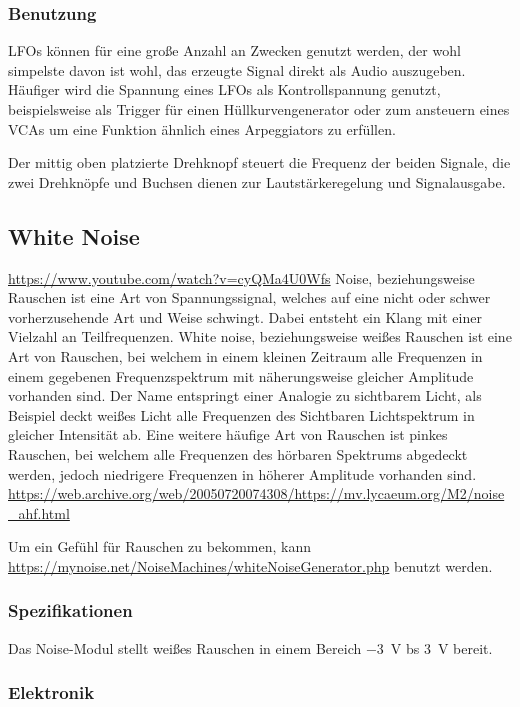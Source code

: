 \subsubsection{Benutzung}
\label{sec:org00ae4b0}
LFOs können für eine große Anzahl an Zwecken genutzt werden, der wohl simpelste davon ist wohl, das erzeugte Signal direkt als Audio auszugeben. Häufiger wird die Spannung eines LFOs als Kontrollspannung genutzt, beispielsweise als Trigger für einen Hüllkurvengenerator oder zum ansteuern eines VCAs um eine Funktion ähnlich eines Arpeggiators zu erfüllen.

Der mittig oben platzierte Drehknopf steuert die Frequenz der beiden Signale, die zwei Drehknöpfe und Buchsen dienen zur Lautstärkeregelung und Signalausgabe.

\subsection{White Noise}
\label{sec:orgd663e80}
\url{https://www.youtube.com/watch?v=cyQMa4U0Wfs}
Noise, beziehungsweise Rauschen ist eine Art von Spannungssignal, welches auf eine nicht oder schwer vorherzusehende Art und Weise schwingt. Dabei entsteht ein Klang mit einer Vielzahl an Teilfrequenzen. White noise, beziehungsweise weißes Rauschen ist eine Art von Rauschen, bei welchem in einem kleinen Zeitraum alle Frequenzen in einem gegebenen Frequenzspektrum mit näherungsweise gleicher Amplitude vorhanden sind. Der Name entspringt einer Analogie zu sichtbarem Licht, als Beispiel deckt weißes Licht alle Frequenzen des Sichtbaren Lichtspektrum in gleicher Intensität ab. Eine weitere häufige Art von Rauschen ist pinkes Rauschen, bei welchem alle Frequenzen des hörbaren Spektrums abgedeckt werden, jedoch niedrigere Frequenzen in höherer Amplitude vorhanden sind.
\url{https://web.archive.org/web/20050720074308/https://mv.lycaeum.org/M2/noise\_ahf.html}

Um ein Gefühl für Rauschen zu bekommen, kann \url{https://mynoise.net/NoiseMachines/whiteNoiseGenerator.php} benutzt werden.

\subsubsection{Spezifikationen}
\label{sec:orgd17f7b6}
Das Noise-Modul stellt weißes Rauschen in einem Bereich \SI{-3}{\volt} bs \SI{3}{\volt} bereit.

\subsubsection{Elektronik}
\label{sec:org20ff73a}
